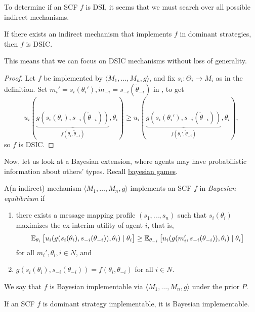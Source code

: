 	To determine if an SCF $f$ is DSI, it seems that we must search over all possible indirect mechanisms.

	\begin{ftheo}
		If there exists an indirect mechanism that implements $f$ in dominant strategies, then $f$ is DSIC.
	\end{ftheo}
	This means that we can focus on DSIC mechanisms without loss of generality.
	\begin{proof}
		Let $f$ be implemented by $\langle M_1,\ldots,M_n,g\rangle$, and fix $s_i : \Theta_i \to M_i$ as in the definition. Set $m_i' = s_i(\theta_i'), \widetilde{m}_{-i} = s_{-i}(\widetilde{\theta}_{-i})$ in , to get
		\[ u_i(\underbrace{g(s_i(\theta_i),s_{-i}(\widetilde{\theta}_{-i}))}_{f(\theta_i,\widetilde\theta_{-i})},\theta_i) \ge u_i(\underbrace{g(s_i(\theta_i'),s_{-i}(\widetilde\theta_{-i}))}_{f(\theta_i',\widetilde\theta_{-i})},\theta_i), \]
		so $f$ is DSIC.
	\end{proof}

	Now, let us look at a Bayesian extension, where agents may have probabilistic information about others' types. Recall \hyperref[def: bayesian game]{bayesian games}.\\

	\begin{fdef}
		A(n indirect) mechanism $\langle M_1,\ldots,M_n,g\rangle$ implements an SCF $f$ in \emph{Bayesian equilibrium} if
		\begin{enumerate}
			\item there exists a message mapping profile $(s_1,\ldots,s_n)$ such that $s_i(\theta_i)$ maximizes the ex-interim utility of agent $i$, that is,
			\[ \mathbb{E}_{\theta_i} \left[ u_i(g(s_i(\theta_i),s_{-i}(\theta_{-i})),\theta_i) \mid \theta_i \right] \ge \mathbb{E}_{\theta_{-i}} \left[ u_i(g(m_i',s_{-i}(\theta_{-i})),\theta_i) \mid \theta_i \right] \]
			for all $m_i',\theta_i,i\in N$, and
			\item $g(s_i(\theta_i),s_{-i}(\theta_{-i})) = f(\theta_i,\theta_{-i})$ for all $i \in N$.
		\end{enumerate}	
		We say that $f$ is Bayesian implementable via $\langle M_1,\ldots,M_n,g\rangle$ under the prior $P$.
	\end{fdef}

	\begin{fprop}
		If an SCF $f$ is dominant strategy implementable, it is Bayesian implementable.
	\end{fprop}

